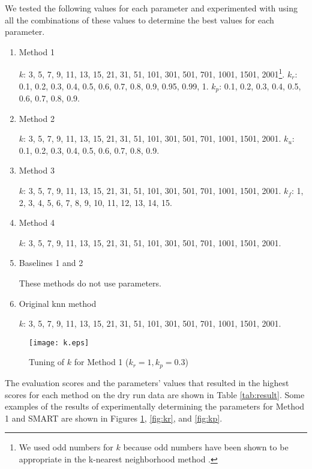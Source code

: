 \documentclass[english]{jnlp_1.2c}
\begin{document}
We tested the following values for each parameter 
and experimented with using 
all the combinations of these values 
to determine the best values for each parameter. 
\begin{enumerate}
\item 
Method 1

$k$: 3, 5, 7, 9, 11, 13, 15, 21, 31, 51, 101, 301, 501, 701, 1001, 1501, 2001\footnote{We used
odd numbers for $k$ because 
odd numbers have been shown to be appropriate in the k-nearest neighborhood method \cite{Okamoto97B_2}.}.
$k_r$: 0.1, 0.2, 0.3, 0.4, 0.5, 0.6, 0.7, 0.8, 0.9, 0.95, 0.99, 1. 
$k_p$: 0.1, 0.2, 0.3, 0.4, 0.5, 0.6, 0.7, 0.8, 0.9. 

\item 
Method 2

$k$: 3, 5, 7, 9, 11, 13, 15, 21, 31, 51, 101, 301, 501, 701, 1001, 1501, 2001. 
$k_u$: 0.1, 0.2, 0.3, 0.4, 0.5, 0.6, 0.7, 0.8, 0.9. 

\item 
Method 3

$k$: 3, 5, 7, 9, 11, 13, 15, 21, 31, 51, 101, 301, 501, 701, 1001, 1501, 2001. 
$k_f$: 1, 2, 3, 4, 5, 6, 7, 8, 9, 10, 11, 12, 13, 14, 15. 

\item 
Method 4

$k$: 3, 5, 7, 9, 11, 13, 15, 21, 31, 51, 101, 301, 501, 701, 1001, 1501, 2001. 

\item 
Baselines 1 and 2

These methods do not use parameters.

\item 
  Original knn method

$k$: 3, 5, 7, 9, 11, 13, 15, 21, 31, 51, 101, 301, 501, 701, 1001, 1501, 2001. 

\end{enumerate}

\begin{figure}[t]
      \begin{center}
        \texttt{[image: k.eps]} 
      \end{center}
    \caption{Tuning of $k$ for Method 1 ($k_r=1,k_p=0.3$)}
    \label{fig:k}
\end{figure}

The evaluation scores and the parameters' values 
that resulted in the highest scores for each method on the dry run data are shown in Table \ref{tab:result}.
Some examples of the results of experimentally determining the parameters 
for Method 1 and SMART 
are shown in Figures \ref{fig:k}, \ref{fig:kr}, and \ref{fig:kp}.
\end{document}
